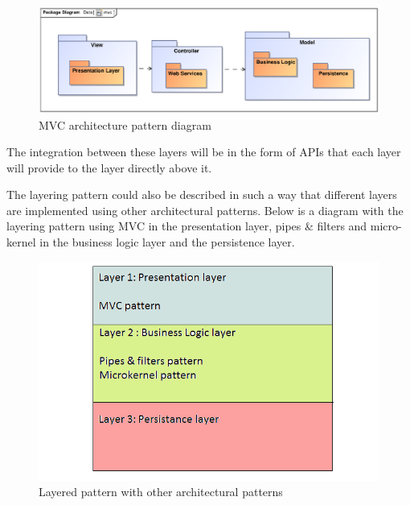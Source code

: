 \documentclass[a4paper]{article}
\begin{document}
\begin{figure}[H]                                                                                                                                               
\includegraphics[width=\textwidth]{mvc.eps}
\caption{MVC architecture pattern diagram \label{overflow}}
\end{figure}                                                        
                                                                                                                                                                                       The integration between these layers will be in the form of APIs that each layer will provide to the layer directly above it.

The layering pattern could also be described in such a way that different layers are implemented using other architectural patterns. Below is a diagram with the layering pattern using MVC in the presentation layer, pipes & filters and micro-kernel in the business logic layer and the persistence layer.

\begin{figure}[H]                                                                                                                                               
\includegraphics[width=\textwidth]{layers_2.png}
\caption{Layered pattern with other architectural patterns \label{overflow}}
\end{figure} 
																																													   
\end{document}
